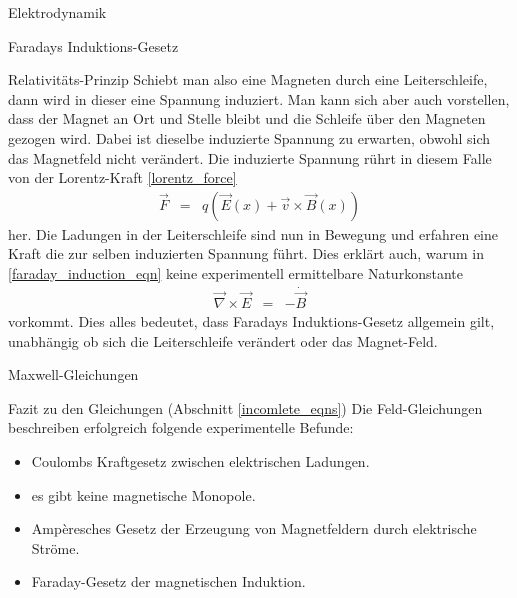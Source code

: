 \begin{chapter}{\titlestr}
\begin{section}{Elektrodynamik}
\begin{subsection}{Faradays Induktions-Gesetz}
\begin{subsubsection}{Relativitäts-Prinzip}
Schiebt man also eine Magneten durch eine Leiterschleife, dann wird in dieser eine Spannung induziert. Man kann sich aber auch vorstellen, dass der Magnet an Ort und Stelle bleibt und die Schleife
über den Magneten gezogen wird. Dabei ist dieselbe induzierte Spannung zu erwarten, obwohl sich das Magnetfeld nicht verändert. Die induzierte Spannung rührt in diesem Falle von der Lorentz-Kraft \ref{lorentz_force}
\begin{eqnarray*}
\vec{F} &=& q\left(\vec{E}(x)+\vec{v}\times\vec{B}(x)\right)
\end{eqnarray*}
her. Die Ladungen in der Leiterschleife sind nun in Bewegung und erfahren eine Kraft die zur selben induzierten Spannung führt. Dies erklärt auch, warum in \ref{faraday_induction_eqn}
keine experimentell ermittelbare Naturkonstante
\begin{eqnarray*}
\vec{\nabla}\times\vec{E} &=& -\dot{\vec{B}}
\end{eqnarray*}
vorkommt. Dies alles bedeutet, dass Faradays Induktions-Gesetz allgemein gilt, unabhängig ob sich die Leiterschleife verändert oder das Magnet-Feld.
\end{subsubsection}
\end{subsection}

\begin{subsection}{Maxwell-Gleichungen}
\begin{subsubsection}{Fazit zu den Gleichungen (Abschnitt \ref{incomlete_eqns})}
Die Feld-Gleichungen beschreiben erfolgreich folgende experimentelle Befunde:
\begin{itemize}
	\item Coulombs Kraftgesetz zwischen elektrischen Ladungen.
	\item es gibt keine magnetische Monopole.
	\item Ampèresches Gesetz der Erzeugung von Magnetfeldern durch elektrische Ströme.
	\item Faraday-Gesetz der magnetischen Induktion.
\end{itemize}
\end{subsubsection}


\end{subsection}
\end{section}
\end{chapter}
